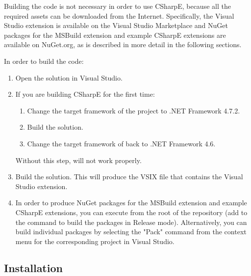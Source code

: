 Building the code is not necessary in order to use CSharpE, because all the required assets can be downloaded from the Internet. Specifically, the Visual Studio extension is available on the Visual Studio Marketplace and NuGet packages for the MSBuild extension and example CSharpE extensions are available on NuGet.org, as is described in more detail in the following sections.

In order to build the code:

\begin{enumerate}
\item Open the solution  in Visual Studio.
\item If you are building CSharpE for the first time:

\begin{enumerate}
\item Change the target framework of the project  to .NET Framework 4.7.2.
\item Build the solution.
\item Change the target framework of  back to .NET Framework 4.6.
\end{enumerate}

Without this step,  will not work properly. \cite{iactg-net46}


\item Build the solution. This will produce the VSIX file that contains the Visual Studio extension.

\item In order to produce NuGet packages for the MSBuild extension and example CSharpE extensions, you can execute  from the root of the repository (add  to the command to build the packages in Release mode). Alternatively, you can build individual packages by selecting the "Pack" command from the context menu for the corresponding project in Visual Studio.


\end{enumerate}

\subsection{Installation}

